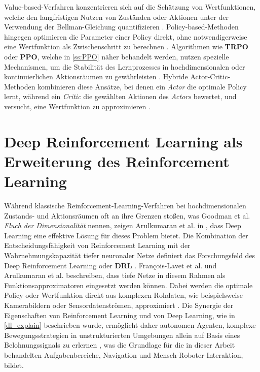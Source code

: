 Value-based-Verfahren konzentrieren sich auf die Schätzung von Wertfunktionen, welche den langfristigen Nutzen von Zuständen oder Aktionen unter der Verwendung der Bellman-Gleichung quantifizieren \cite{sutton2018reinforcement, ozalpAdvancementsDeepReinforcement2024}. \newline
Policy-based-Methoden hingegen optimieren die Parameter einer Policy direkt, ohne notwendigerweise eine Wertfunktion als Zwischenschritt zu berechnen \cite{sutton2018reinforcement, ozalpAdvancementsDeepReinforcement2024}. Algorithmen wie \textbf{TRPO} oder \textbf{PPO}, welche in \autoref{ss:PPO} näher behandelt werden, nutzen spezielle Mechanismen, um die Stabilität des Lernprozesses in hochdimensionalen oder kontinuierlichen Aktionsräumen zu gewährleisten \cite{ozalpAdvancementsDeepReinforcement2024, arulkumaranDRL2017}. \newline
Hybride Actor-Critic-Methoden kombinieren diese Ansätze, bei denen ein \textit{Actor} die optimale Policy lernt, während ein \textit{Critic} die gewählten Aktionen des \textit{Actors} bewertet, und versucht, eine Wertfunktion zu approximieren \cite{sutton2018reinforcement, arulkumaranDRL2017}.
\section{Deep Reinforcement Learning als Erweiterung des Reinforcement Learning}
Während klassische Reinforcement-Learning-Verfahren bei hochdimensionalen Zustands- und Aktionsräumen oft an ihre Grenzen stoßen, was Goodman et al. \cite{Goodfellow-et-al-2016} \textit{Fluch der Dimensionalität} nennen, zeigen Arulkumaran et al. in \cite{arulkumaranDRL2017}, dass Deep Learning eine effektive Lösung für dieses Problem bietet. Die Kombination der Entscheidungsfähigkeit von Reinforcement Learning mit der Wahrnehmungskapazität tiefer neuronaler Netze definiert das Forschungsfeld des Deep Reinforcement Learning oder \textbf{DRL} \cite{francois-lavetIntroductionDeepReinforcement2018, arulkumaranDRL2017, yuRewardModelsDeep2025}. \newline
François-Lavet et al. \cite{francois-lavetIntroductionDeepReinforcement2018} und Arulkumaran et al. \cite{arulkumaranDRL2017} beschreiben, dass tiefe Netze in diesem Rahmen als Funktionsapproximatoren eingesetzt werden können. Dabei werden die optimale Policy oder Wertfunktion direkt aus komplexen Rohdaten, wie beispielsweise Kamerabildern oder Sensordatenströmen, approximiert \cite{levineEndtoEndTrainingDeep2016, mnihHumanlevelControlDeep2015}. \newline
Die Synergie der Eigenschaften von Reinforcement Learning und von Deep Learning, wie in \autoref{dl_explain} beschrieben wurde, ermöglicht daher autonomen Agenten, komplexe Bewegungsstrategien in unstrukturierten Umgebungen allein auf Basis eines Belohnungssignals zu erlernen \cite{arulkumaranDRL2017, hwangboLearningAgileDynamic2019, tangDeepReinforcementLearning2024}, was die Grundlage für die in dieser Arbeit behandelten Aufgabenbereiche,
Navigation und Mensch-Roboter-Interaktion, bildet.

